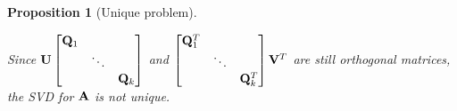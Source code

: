 \documentclass[11pt]{article}
\def\A{{\bf A}}
\def\U{{\bf U}}
\def\V{{\bf V}}
\def\Q{{\bf Q}}
\newtheorem{proposition}{Proposition}[section]
\begin{document}
\begin{proposition}[Unique problem]
\begin{itemize}
  Since  $\U\begin{bmatrix} \Q_1 & & \\ & \ddots & \\ & & \Q_k \end{bmatrix}$ and $\begin{bmatrix} \Q_1^T & & \\ & \ddots & \\ & & \Q_k^T \end{bmatrix} \V^T$ are still orthogonal matrices,
  the SVD for $\A$ is not unique.
 \end{itemize}

 
\end{proposition}
\end{document}
